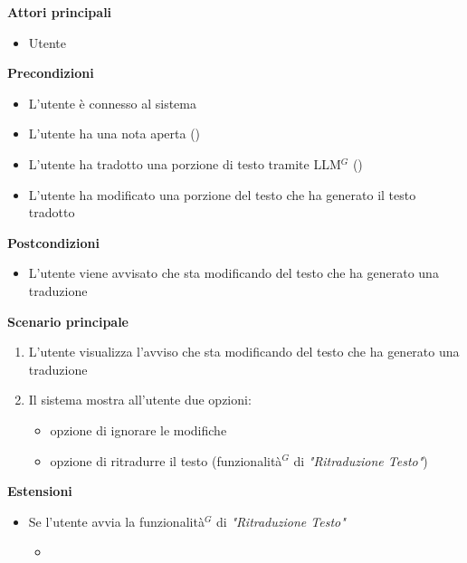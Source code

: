 \documentclass[a4paper,10pt]{article}
\begin{document}
    \textbf{Attori principali}
    \begin{itemize}
        \item Utente
    \end{itemize}
    \textbf{Precondizioni}
    \begin{itemize}
        \item L'utente è connesso al sistema
        \item L'utente ha una nota aperta ()
        \item L'utente ha tradotto una porzione di testo tramite LLM$^G$ ()
        \item L'utente ha modificato una porzione del testo che ha generato il testo tradotto
    \end{itemize}
    \textbf{Postcondizioni}
    \begin{itemize}
        \item L'utente viene avvisato che sta modificando del testo che ha generato una traduzione
    \end{itemize}
    \textbf{Scenario principale}
    \begin{enumerate}
        \item L'utente visualizza l'avviso che sta modificando del testo che ha generato una traduzione
        \item Il sistema mostra all'utente due opzioni:
        \begin{itemize}
            \item opzione di ignorare le modifiche
            \item opzione di ritradurre il testo (funzionalità$^G$ di \textit{"Ritraduzione Testo"})
        \end{itemize}
    \end{enumerate}
    \textbf{Estensioni}
    \begin{itemize}
        \item Se l'utente avvia la funzionalità$^G$ di \textit{"Ritraduzione Testo"}
        \begin{itemize}
            \item {}
        \end{itemize}
    \end{itemize}
\end{document}
